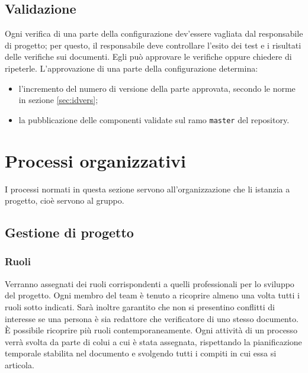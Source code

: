 \subsection{Validazione}
Ogni verifica di una parte della configurazione dev'essere vagliata dal responsabile di progetto; per questo, il responsabile deve controllare l'esito dei test e i risultati delle verifiche sui documenti. Egli può approvare le verifiche oppure chiedere di ripeterle. L'approvazione di una parte della configurazione determina:
\begin{itemize}
	\item l'incremento del numero di versione della parte approvata, secondo le norme in sezione \ref{sec:idvers};
	\item la pubblicazione delle componenti validate sul ramo \texttt{master} del repository.
\end{itemize}





\section{Processi organizzativi} \label{sec:organizzativi}
I processi normati in questa sezione servono all'organizzazione che li istanzia a progetto, cioè servono al gruppo.


\subsection{Gestione di progetto}

\subsubsection{Ruoli} \label{sec:ruoli}
Verranno assegnati dei ruoli corrispondenti a quelli professionali per lo sviluppo del progetto. Ogni membro del team è tenuto a ricoprire almeno una volta tutti i ruoli sotto indicati. Sarà inoltre garantito che non si presentino conflitti di interesse se una persona è sia redattore che verificatore di uno stesso documento. È possibile ricoprire più ruoli contemporaneamente.
Ogni attività di un processo verrà svolta da parte di colui a cui è stata assegnata, rispettando la pianificazione temporale stabilita nel documento \PdP{} e svolgendo tutti i compiti in cui essa si articola.
